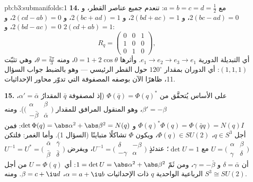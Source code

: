 \begin{solution}{pb:b3:submanifolds:1}
\textbf{14.} مع $a = b = c = d = \frac12$: تنعدم جميع عناصر القطر، و
$2(bc - ad) = 0$، و $2(bd + ac) = 1$، و $2(bc +
ad) = 1$، و
$2(cd - ab) = 0$، و $2(bd - ac) = 0$، و $2(cd + ab) =
1$:
\[
R_q = \begin{pmatrix} 0 & 0 & 1\\ 1 & 0 & 0\\ 0 & 1 & 0
\end{pmatrix},
\]
أي التبديلة الدورية $e_1 \to e_2 \to e_3 \to e_1$. وأثرها $0 = 1 + 2\cos\theta$، ومنه $\theta = \frac{2\pi}3$، وهي
تثبّت $(1,1,1)$: أي الدوران بمقدار $120^\circ$ حول القطر
الرئيسي --- وهو بالضبط جواب السؤال 11، ظاهرًا الآن بوصفه
المصفوفة التي تدوّر محاور الإحداثيات.

\textbf{15.} على الأساس يُتحقَّق من $\Phi(\bar q) =
\Phi(q)^*$ (إذ لمصفوفة $\bar q$
المقدارُ $\alpha' =
\bar\alpha$، $\beta' = -\beta$، وهو المنقول المرافق للمقدار $\bigl(\begin{smallmatrix}\alpha & \beta\\
-\bar\beta & \bar\alpha\end{smallmatrix}\bigr)$).
ومنه $\Phi(q)^*\Phi(q) = \Phi(\bar qq) = N(q)I$ و $\det\Phi(q)
= \abs\alpha^2 + \abs\beta^2 = N(q)$: فمن أجل $q \in S^3$، $\Phi(q) \in SU(2)$، ويكون
$\Phi$ تشاكلًا متباينًا (السؤال 1). وأما الغمر: فلتكن $U =
\bigl(\begin{smallmatrix}\alpha & \beta\\ \gamma &
\delta\end{smallmatrix}\bigr)$
مع $\det U = 1$؛ عندئذٍ $U^{-1} = \bigl(\begin{smallmatrix}\delta & -\beta\\
-\gamma & \alpha\end{smallmatrix}\bigr)$، ويفرض $U^{-1} = U^*
= \bigl(\begin{smallmatrix}\bar\alpha & \bar\gamma\\
\bar\beta & \bar\delta\end{smallmatrix}\bigr)$ أن $\delta = \bar\alpha$
و $\gamma = -\bar\beta$، ومن ثَمّ $1 =
\det U = \abs\alpha^2 + \abs\beta^2$: أي $U = \Phi(q)$ من أجل الرباعية
الواحدية $q$ ذات الإحداثيات $\alpha = a + \iu b$، $\beta = c + \iu d$. ومنه $S^3 \cong SU(2)$.


\end{solution}
